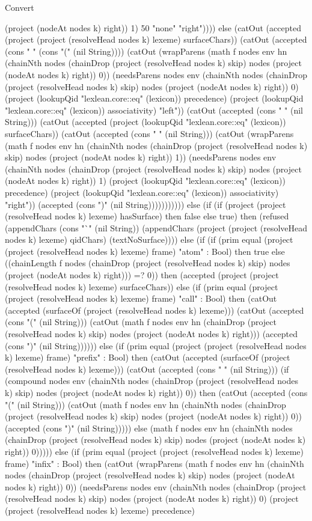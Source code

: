 \begin{lexlean}{Convert}
\begin{semanticmodule}
{(project (nodeAt nodes k) right)) 1) 50 "none" "right")))) else (catOut (accepted (project (project (resolveHead nodes k) lexeme) surfaceChars)) (catOut (accepted (cons " " (cons "(" (nil String)))) (catOut (wrapParens (math f nodes env hn (chainNth nodes (chainDrop (project (resolveHead nodes k) skip) nodes (project (nodeAt nodes k) right)) 0)) (needsParens nodes env (chainNth nodes (chainDrop (project (resolveHead nodes k) skip) nodes (project (nodeAt nodes k) right)) 0) (project (lookupQid "lexlean.core::eq" (lexicon)) precedence) (project (lookupQid "lexlean.core::eq" (lexicon)) associativity) "left")) (catOut (accepted (cons " " (nil String))) (catOut (accepted (project (lookupQid "lexlean.core::eq" (lexicon)) surfaceChars)) (catOut (accepted (cons " " (nil String))) (catOut (wrapParens (math f nodes env hn (chainNth nodes (chainDrop (project (resolveHead nodes k) skip) nodes (project (nodeAt nodes k) right)) 1)) (needsParens nodes env (chainNth nodes (chainDrop (project (resolveHead nodes k) skip) nodes (project (nodeAt nodes k) right)) 1) (project (lookupQid "lexlean.core::eq" (lexicon)) precedence) (project (lookupQid "lexlean.core::eq" (lexicon)) associativity) "right")) (accepted (cons ")" (nil String))))))))))) else (if (if (project (project (resolveHead nodes k) lexeme) hasSurface) then false else true) then (refused (appendChars (cons "`" (nil String)) (appendChars (project (project (resolveHead nodes k) lexeme) qidChars) (textNoSurface)))) else (if (if (prim equal (project (project (resolveHead nodes k) lexeme) frame) "atom" : Bool) then true else ((chainLength f nodes (chainDrop (project (resolveHead nodes k) skip) nodes (project (nodeAt nodes k) right))) =? 0)) then (accepted (project (project (resolveHead nodes k) lexeme) surfaceChars)) else (if (prim equal (project (project (resolveHead nodes k) lexeme) frame) "call" : Bool) then (catOut (accepted (surfaceOf (project (resolveHead nodes k) lexeme))) (catOut (accepted (cons "(" (nil String))) (catOut (math f nodes env hn (chainDrop (project (resolveHead nodes k) skip) nodes (project (nodeAt nodes k) right))) (accepted (cons ")" (nil String)))))) else (if (prim equal (project (project (resolveHead nodes k) lexeme) frame) "prefix" : Bool) then (catOut (accepted (surfaceOf (project (resolveHead nodes k) lexeme))) (catOut (accepted (cons " " (nil String))) (if (compound nodes env (chainNth nodes (chainDrop (project (resolveHead nodes k) skip) nodes (project (nodeAt nodes k) right)) 0)) then (catOut (accepted (cons "(" (nil String))) (catOut (math f nodes env hn (chainNth nodes (chainDrop (project (resolveHead nodes k) skip) nodes (project (nodeAt nodes k) right)) 0)) (accepted (cons ")" (nil String))))) else (math f nodes env hn (chainNth nodes (chainDrop (project (resolveHead nodes k) skip) nodes (project (nodeAt nodes k) right)) 0))))) else (if (prim equal (project (project (resolveHead nodes k) lexeme) frame) "infix" : Bool) then (catOut (wrapParens (math f nodes env hn (chainNth nodes (chainDrop (project (resolveHead nodes k) skip) nodes (project (nodeAt nodes k) right)) 0)) (needsParens nodes env (chainNth nodes (chainDrop (project (resolveHead nodes k) skip) nodes (project (nodeAt nodes k) right)) 0) (project (project (resolveHead nodes k) lexeme) precedence) }
\end{semanticmodule}
\end{lexlean}
